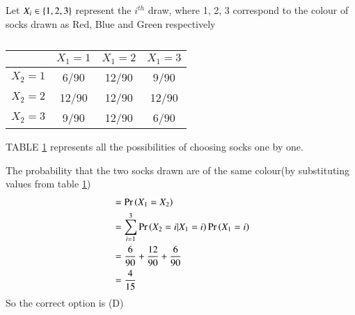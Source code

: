 Let $X_i \in \left\{1, 2, 3\right\}$ represent the $i^{th}$ draw, where 1, 2, 3 correspond to the colour of socks drawn as Red, Blue and Green respectively
\begin{table}[ht]
\centering 
\caption{}
\begin{tabular}{|c|c|c|c|}
\hline
           & $X_1 = 1$ & $X_1 = 2$ & $X_1 = 3$\\
\hline
$X_2 = 1$  & 6/90      & 12/90     & 9/90  \\
\hline
$X_2 = 2$  & 12/90      & 12/90    & 12/90  \\
\hline
$X_2 = 3$  & 9/90      & 12/90    & 6/90  \\
\hline
\end{tabular}
\label{cond/1/table}
\end{table}
  
TABLE  \ref{cond/1/table} represents all the possibilities of choosing socks one by one.
  
 
The probability that the two socks drawn are of the same colour(by substituting values from table \ref{cond/1/table})
 \begin{align}
     &= \Pr\left(X_1 = X_2\right) \\
     &= \sum_{i = 1}^3 \Pr\left(X_2 = i | X_1 = i\right)\Pr\left(X_1 = i\right)\\
     &= \dfrac{6}{90} +\dfrac{12}{90} + \dfrac{6}{90}\\
     &= \dfrac{4}{15}
 \end{align}
 So the correct option is (D)
